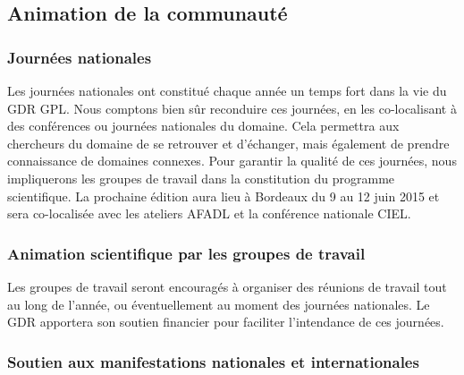 \documentclass[11pt]{article}
\begin{document}

\subsection{Animation de la communauté}

\subsubsection{Journées nationales}

Les journées nationales ont constitué chaque année un temps fort dans la vie du
GDR GPL. Nous comptons bien sûr reconduire ces journées, en les co-localisant à
des conférences ou journées nationales du domaine.
Cela permettra aux chercheurs du domaine de se retrouver et d'échanger, mais
également de prendre connaissance de domaines connexes. 
Pour garantir la qualité de ces journées, nous impliquerons les groupes de travail dans la constitution du programme scientifique.
La prochaine édition aura lieu à Bordeaux du 9 au 12 juin 2015 et sera co-localisée avec les ateliers AFADL et la conférence nationale CIEL.


\subsubsection{Animation scientifique par les groupes de travail}

Les groupes de travail seront encouragés à organiser des réunions de travail
tout au long de l'année, ou éventuellement au moment des journées nationales. 
Le GDR apportera son soutien financier pour faciliter l'intendance de ces journées.

\subsubsection{Soutien aux manifestations nationales et internationales}
\end{document}
